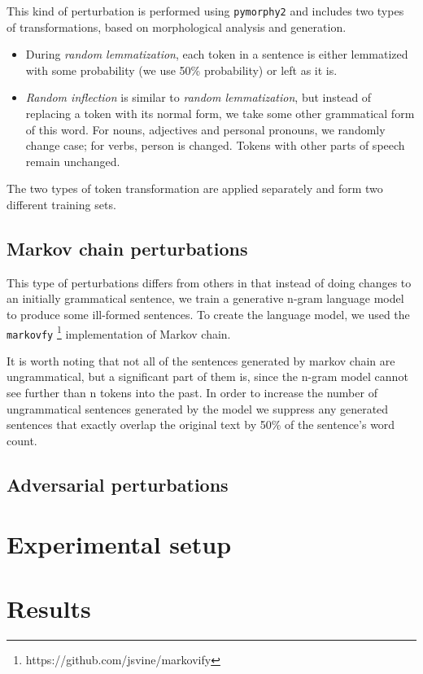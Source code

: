 \documentclass[11pt,a4paper]{article}
\begin{document}
This kind of perturbation is performed using \texttt{pymorphy2} \cite{pymorphy2} and includes two types of transformations, based on morphological analysis and generation.

\begin{itemize}
    \item During \emph{random lemmatization}, each token in a sentence is either lemmatized with some probability (we use 50\% probability) or left as it is.
    \item \emph{Random inflection} is similar to \emph{random lemmatization}, but instead of replacing a token with its normal form, we take some other grammatical form of this word. For nouns, adjectives and personal pronouns, we randomly change case; for verbs, person is changed. Tokens with other parts of speech remain unchanged.
\end{itemize}

The two types of token transformation are applied separately and form two different training sets.

\subsection{Markov chain perturbations}

This type of perturbations differs from others in that instead of doing changes to an initially grammatical sentence, we train a generative n-gram language model to produce some ill-formed sentences. To create the language model, we used the \texttt{markovfy} \footnote{https://github.com/jsvine/markovify} implementation of Markov chain.

It is worth noting that not all of the sentences generated by markov chain are ungrammatical, but a significant part of them is, since the n-gram model cannot see further than n tokens into the past. In order to increase the number of ungrammatical sentences generated by the model we suppress any generated sentences that exactly overlap the original text by 50\% of the sentence's word count.

\subsection{Adversarial perturbations}

\section{Experimental setup}
\label{sec:setup}

\section{Results}
\label{sec:results}


\end{document}

